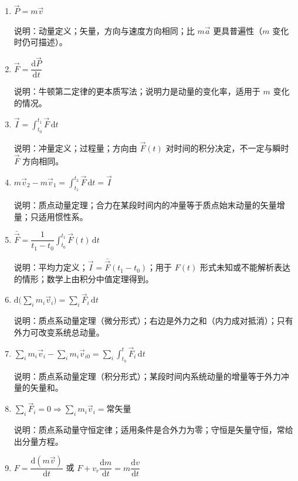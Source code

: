 \documentclass[12pt,a4paper]{ctexart}
\begin{document}
\begin{enumerate}[leftmargin=3em,label=\textbf{公式\arabic*}：,ref=公式\arabic*]

    \item $\vec{P} = m\vec{v}$

    说明：动量定义；矢量，方向与速度方向相同；比 $m\vec{a}$ 更具普遍性（$m$ 变化时仍可描述）。

    \item $\vec{F} = \dfrac{\mathrm{d}\vec{P}}{\mathrm{d}t}$

    说明：牛顿第二定律的更本质写法；说明力是动量的变化率，适用于 $m$ 变化的情况。

    \item $\vec{I} = \displaystyle\int_{t_0}^{t_1}\vec{F}\,\mathrm{d}t$

    说明：冲量定义；过程量；方向由 $\vec{F}(t)$ 对时间的积分决定，不一定与瞬时 $\vec{F}$ 方向相同。

    \item $m\vec{v}_2 - m\vec{v}_1 = \displaystyle\int_{t_1}^{t_2}\vec{F}\,\mathrm{d}t = \vec{I}$

    说明：质点动量定理；合力在某段时间内的冲量等于质点始末动量的矢量增量；只适用惯性系。

    \item $\bar{\vec{F}} = \dfrac{1}{t_1 - t_0}\displaystyle\int_{t_0}^{t_1}\vec{F}(t)\,\mathrm{d}t$

    说明：平均力定义；$\vec{I} = \bar{\vec{F}}(t_1 - t_0)$；用于 $F(t)$ 形式未知或不能解析表达的情形；数学上由积分中值定理得到。

    \item $\mathrm{d}\biggl(\sum_i m_i\vec{v}_i\biggr) = \sum_i \vec{F}_i\,\mathrm{d}t$

    说明：质点系动量定理（微分形式）；右边是外力之和（内力成对抵消）；只有外力可改变系统总动量。

    \item $\sum_i m_i\vec{v}_i - \sum_i m_i\vec{v}_{i0} = \sum_i \displaystyle\int_{t_0}^{t}\vec{F}_i\,\mathrm{d}t$

    说明：质点系动量定理（积分形式）；某段时间内系统动量的增量等于外力冲量的矢量和。

    \item $\sum_i \vec{F}_i = 0 \Rightarrow \sum_i m_i\vec{v}_i = \text{常矢量}$

    说明：质点系动量守恒定律；适用条件是合外力为零；守恒是矢量守恒，常给出分量方程。

    \item $F = \dfrac{\mathrm{d}(m\vec{v})}{\mathrm{d}t}$ 或 $F + v_r\dfrac{\mathrm{d}m}{\mathrm{d}t} = m\dfrac{\mathrm{d}v}{\mathrm{d}t}$


\end{enumerate}
\end{document}
